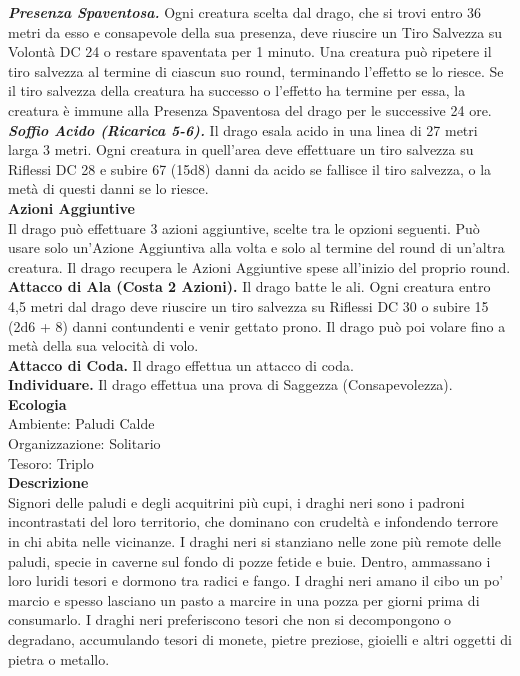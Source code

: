 \begin{multicols}{2}
\emph{\textbf{Presenza Spaventosa.}} Ogni creatura scelta dal drago, che si trovi entro 36 metri da esso e consapevole della sua presenza, deve riuscire un Tiro Salvezza su Volontà DC  24 o restare spaventata per 1 minuto. Una creatura può ripetere il tiro salvezza al termine di ciascun suo round, terminando l'effetto se lo riesce. Se il tiro salvezza della creatura ha successo o l'effetto ha termine per essa, la creatura è immune alla Presenza Spaventosa del drago per le successive 24 ore.\\
\emph{\textbf{Soffio Acido (Ricarica 5-6).}} Il drago esala acido in una linea di 27 metri larga 3 metri. Ogni creatura in quell'area deve effettuare un tiro salvezza su Riflessi DC  28 e subire 67 (15d8) danni da acido se fallisce il tiro salvezza, o la metà di questi danni se lo riesce.\\
\textbf{Azioni Aggiuntive}\\
Il drago può effettuare 3 azioni aggiuntive, scelte tra le opzioni seguenti. Può usare solo un'Azione Aggiuntiva alla volta e solo al termine del round di un'altra creatura. Il drago recupera le Azioni Aggiuntive spese all'inizio del proprio round.\\
\textbf{Attacco di Ala (Costa 2 Azioni).} Il drago batte le ali. Ogni creatura entro 4,5 metri dal drago deve riuscire un tiro salvezza su Riflessi DC  30 o subire 15 (2d6 + 8) danni contundenti e venir gettato prono. Il drago può poi volare fino a metà della sua velocità di volo.\\
\textbf{Attacco di Coda.} Il drago effettua un attacco di coda.  \\
\textbf{Individuare.} Il drago effettua una prova di Saggezza (Consapevolezza).\\
\textbf{Ecologia}\\
Ambiente: Paludi Calde\\
Organizzazione: Solitario\\
Tesoro: Triplo\\
\textbf{Descrizione}\\
Signori delle paludi e degli acquitrini più cupi, i draghi neri sono i padroni incontrastati del loro territorio, che dominano con crudeltà e infondendo terrore in chi abita nelle vicinanze. I draghi neri si stanziano nelle zone più remote delle paludi, specie in caverne sul fondo di pozze fetide e buie. Dentro, ammassano i loro luridi tesori e dormono tra radici e fango. I draghi neri amano il cibo un po’ marcio e spesso lasciano un pasto a marcire in una pozza per giorni prima di consumarlo. I draghi neri preferiscono tesori che non si decompongono o degradano, accumulando tesori di monete, pietre preziose, gioielli e altri oggetti di pietra o metallo.\\


\end{multicols}
